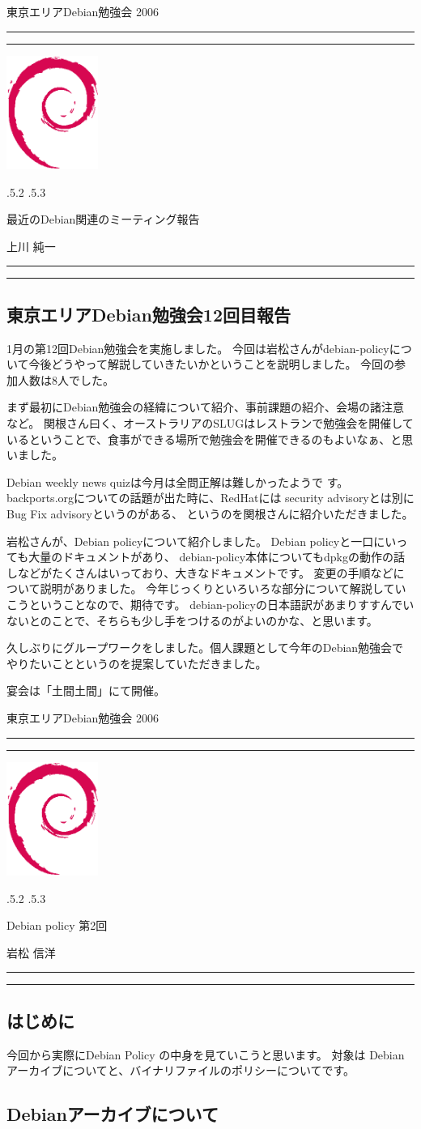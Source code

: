 \documentclass[mingoth,a4paper]{jsarticle}
\makeatletter
\renewcommand{\section}{\@startsection{section}{1}{\z@}%
    {\Cvs \@plus.5\Cdp \@minus.2\Cdp}%
    {.5\Cvs \@plus.3\Cdp}%
    {\normalfont\Large\headfont\raggedright\centering}} %
\newcommand{\dancersection}[2]{%
\newpage
東京エリアDebian勉強会 2006
\hrule
\vspace{0.5mm}
\hrule
\hfill{}\includegraphics[width=3cm]{image200502/openlogo-nd.eps}\\
\vspace{-4cm}
\begin{center}
  \section{#1}
\end{center}
\hfill{}#2\hspace{3cm}\space\\
\hrule
\hrule
\vspace{1cm}
}
\makeatother
\begin{document}
\dancersection{最近のDebian関連のミーティング報告}{上川 純一}

\subsection{東京エリアDebian勉強会12回目報告}

	  1月の第12回Debian勉強会を実施しました。
	    今回は岩松さんがdebian-policyについて今後どうやって解説していきたいかということを説明しました。
	  今回の参加人数は8人でした。
        
	
	  
	    まず最初にDebian勉強会の経緯について紹介、事前課題の紹介、会場の諸注意など。
	    関根さん曰く、オーストラリアのSLUGはレストランで勉強会を開催しているということで、食事ができる場所で勉強会を開催できるのもよいなぁ、と思いました。
	  
	  
	    Debian weekly news quizは今月は全問正解は難しかったようで
	    す。backports.orgについての話題が出た時に、RedHatには
	    security advisoryとは別にBug Fix advisoryというのがある、
	    というのを関根さんに紹介いただきました。
	  
	  
	    岩松さんが、Debian policyについて紹介しました。
	    Debian policyと一口にいっても大量のドキュメントがあり、
	    debian-policy本体についてもdpkgの動作の話しなどがたくさんはいっており、大きなドキュメントです。
	    変更の手順などについて説明がありました。
	    今年じっくりといろいろな部分について解説していこうということなので、期待です。
	    debian-policyの日本語訳があまりすすんでいないとのことで、そちらも少し手をつけるのがよいのかな、と思います。
	  
	  
	    久しぶりにグループワークをしました。個人課題として今年のDebian勉強会でやりたいことというのを提案していただきました。
	  
	  
	    宴会は「土間土間」にて開催。
	  


\dancersection{Debian policy 第2回}{岩松 信洋}
\label{sec:uekawa}
\subsection{はじめに}
 今回から実際にDebian Policy の中身を見ていこうと思います。
 対象は Debian アーカイブについてと、バイナリファイルのポリシーについてです。

\subsection{Debianアーカイブについて}
\end{document}
